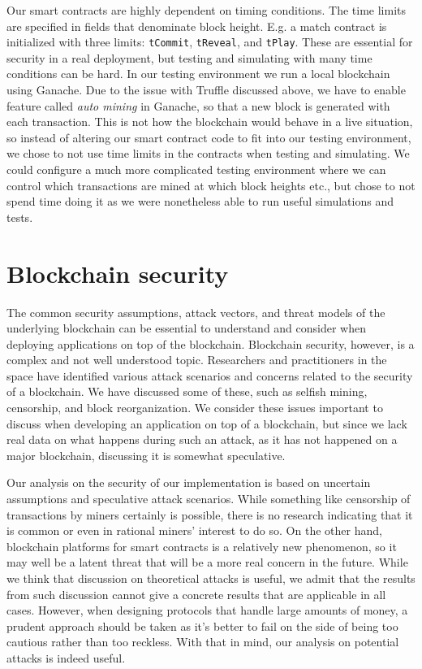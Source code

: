 Our smart contracts are highly dependent on timing conditions. The time limits are specified in fields that denominate block height. E.g. a match contract is initialized with three limits: \texttt{tCommit}, \texttt{tReveal}, and \texttt{tPlay}. These are essential for security in a real deployment, but testing and simulating with many time conditions can be hard. In our testing environment we run a local blockchain using Ganache. Due to the issue with Truffle discussed above, we have to enable feature called \emph{auto mining} in Ganache, so that a new block is generated with each transaction. This is not how the blockchain would behave in a live situation, so instead of altering our smart contract code to fit into our testing environment, we chose to not use time limits in the contracts when testing and simulating. We could configure a much more complicated testing environment where we can control which transactions are mined at which block heights etc., but chose to not spend time doing it as we were nonetheless able to run useful simulations and tests. 

\section{Blockchain security}
\label{sec:discussion-security}

The common security assumptions, attack vectors, and threat models of the underlying blockchain can be essential to understand and consider when deploying applications on top of the blockchain. Blockchain security, however, is a complex and not well understood topic. Researchers and practitioners in the space have identified various attack scenarios and concerns related to the security of a blockchain. We have discussed some of these, such as selfish mining, censorship, and block reorganization. We consider these issues important to discuss when developing an application on top of a blockchain, but since we lack real data on what happens during such an attack, as it has not happened on a major blockchain, discussing it is somewhat speculative.

Our analysis on the security of our implementation is based on uncertain assumptions and speculative attack scenarios. While something like censorship of transactions by miners certainly is possible, there is no research indicating that it is common or even in rational miners' interest to do so. On the other hand, blockchain platforms for smart contracts is a relatively new phenomenon, so it may well be a latent threat that will be a more real concern in the future. While we think that discussion on theoretical attacks is useful, we admit that the results from such discussion cannot give a concrete results that are applicable in all cases. However, when designing protocols that handle large amounts of money, a prudent approach should be taken as it's better to fail on the side of being too cautious rather than too reckless. With that in mind, our analysis on potential attacks is indeed useful. 

